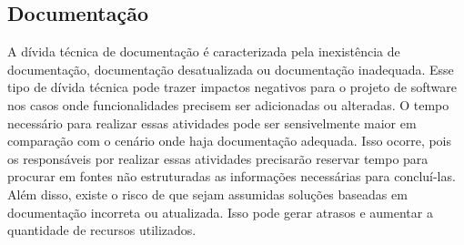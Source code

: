 


\subsection{Documentação}

 A dívida técnica de documentação é caracterizada pela  inexistência de documentação, documentação desatualizada ou documentação inadequada. Esse tipo de dívida técnica pode trazer impactos negativos para o projeto de software nos casos onde funcionalidades precisem ser adicionadas ou alteradas. O tempo necessário para realizar essas atividades pode ser sensivelmente maior em comparação com o cenário onde haja documentação adequada. Isso ocorre, pois os responsáveis por realizar essas atividades precisarão reservar tempo para procurar em fontes não estruturadas as informações necessárias para concluí-las. Além disso, existe o risco de que sejam assumidas soluções baseadas em documentação incorreta ou atualizada. Isso pode gerar atrasos e aumentar a quantidade de recursos utilizados.

